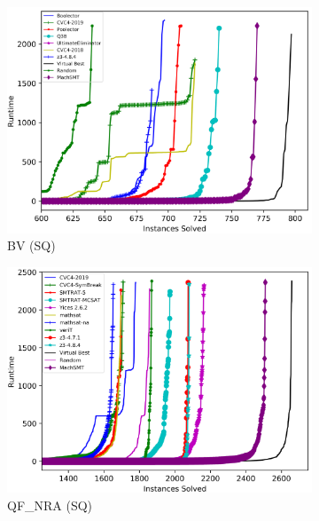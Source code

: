 \documentclass{article}
\begin{document}
\begin{figure}
  \begin{subfigure}{0.48\textwidth}
    \includegraphics[width=\textwidth]{plot/machsmt_bv.png}
    \caption{BV (SQ)}
    \label{fig:machsmt_bv}
  \end{subfigure}
  \hspace{0.75em}
  \begin{subfigure}{0.48\textwidth}
    \includegraphics[width=\textwidth]{plot/machsmt_qf_nra.png}
    \caption{QF\_NRA (SQ)}
    \label{fig:machsmt_qfnra}
  \end{subfigure}\\[1.5em]
  \begin{subfigure}{0.48\textwidth}

\end{subfigure}
\end{figure}
\end{document}
